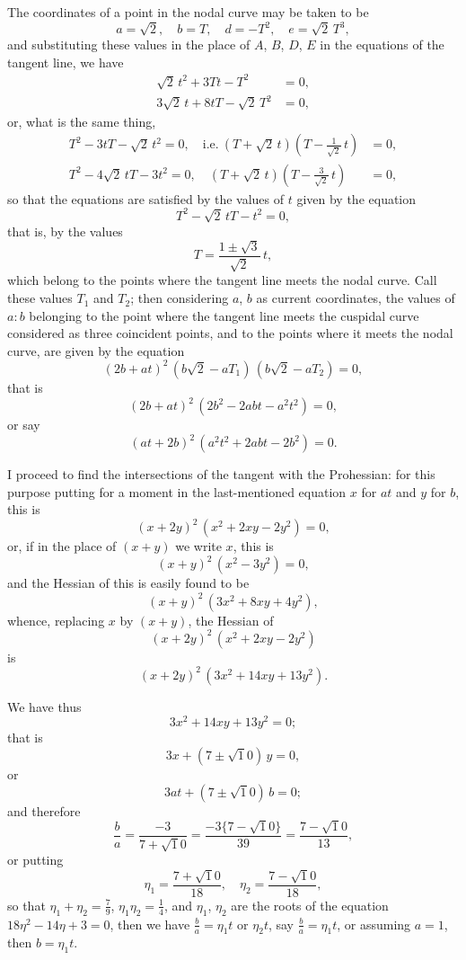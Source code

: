\documentclass[11pt,a4paper]{article}
\begin{document}
The coordinates of a point in the nodal curve may be taken to be
\[
a = \surd 2,\quad b = T,\quad d = -T^{2},\quad e = \surd 2\,T^{3},
\]
and substituting these values in the place of $A$, $B$, $D$, $E$ in the equations of the tangent line, we have
\begin{align*}
\surd 2\,t^{2} + 3Tt - T^{2} &= 0,\\
3\surd 2\,t + 8tT - \surd 2\,T^{2} &= 0,
\end{align*}
or, what is the same thing,
\begin{align*}
T^{2} - 3tT - \surd 2\,t^{2} = 0,\quad \text{i.e.}\ (T + \surd 2\,t)(T - \tfrac{1}{\surd 2}\,t) &= 0,\\
T^{2} - 4\surd 2\,tT - 3t^{2} = 0,\quad (T + \surd 2\,t)(T - \tfrac{3}{\surd 2}\,t) &= 0,
\end{align*}
so that the equations are satisfied by the values of $t$ given by the equation
\[
T^{2} - \surd 2\,tT - t^{2} = 0,
\]
that is, by the values
\[
T = \frac{1 \pm \surd 3}{\surd 2}\,t,
\]
which belong to the points where the tangent line meets the nodal curve. Call these values $T_{1}$ and $T_{2}$; then considering $a$, $b$ as current coordinates, the values of $a : b$ belonging to the point where the tangent line meets the cuspidal curve considered as three coincident points, and to the points where it meets the nodal curve, are given by the equation
\[
(2b + at)^{2}\,(b\surd 2 - aT_{1})\,(b\surd 2 - aT_{2}) = 0,
\]
that is
\[
(2b + at)^{2}\,(2b^{2} - 2abt - a^{2}t^{2}) = 0,
\]
or say
\[
(at + 2b)^{2}\,(a^{2}t^{2} + 2abt - 2b^{2}) = 0.
\]

I proceed to find the intersections of the tangent with the Prohessian: for this purpose putting for a moment in the last-mentioned equation $x$ for $at$ and $y$ for $b$, this is
\[
(x + 2y)^{2}\,(x^{2} + 2xy - 2y^{2}) = 0,
\]
or, if in the place of $(x + y)$ we write $x$, this is
\[
(x + y)^{2}\,(x^{2} - 3y^{2}) = 0,
\]
and the Hessian of this is easily found to be
\[
(x + y)^{2}\,(3x^{2} + 8xy + 4y^{2}),
\]
whence, replacing $x$ by $(x + y)$, the Hessian of
\[
(x + 2y)^{2}\,(x^{2} + 2xy - 2y^{2})
\]
is
\[
(x + 2y)^{2}\,(3x^{2} + 14xy + 13y^{2}).
\]

We have thus
\[
3x^{2} + 14xy + 13y^{2} = 0;
\]
that is
\[
3x + (7 \pm \surd 10)\,y = 0,
\]
or
\[
3at + (7 \pm \surd 10)\,b = 0;
\]
and therefore
\[
\frac{b}{a} = \frac{-3}{7 + \surd 10} = \frac{-3\{7 - \surd 10\}}{39} = \frac{7 - \surd 10}{13},
\]
or putting
\[
\eta_{1} = \frac{7 + \surd 10}{18},\quad \eta_{2} = \frac{7 - \surd 10}{18},
\]
so that $\eta_{1} + \eta_{2} = \tfrac{7}{9}$, $\eta_{1}\eta_{2} = \tfrac{1}{4}$, and $\eta_{1}$, $\eta_{2}$ are the roots of the equation $18\eta^{2} - 14\eta + 3 = 0$, then we have $\tfrac{b}{a} = \eta_{1}t$ or $\eta_{2}t$, say $\tfrac{b}{a} = \eta_{1}t$, or assuming $a = 1$, then $b = \eta_{1}t$.
\end{document}
